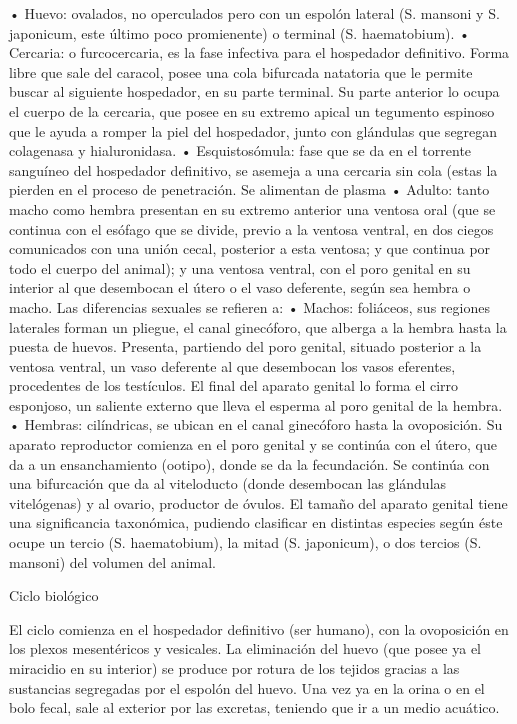 • Huevo: ovalados, no operculados pero con un espolón lateral (S. mansoni y S. japonicum, este último poco promienente) o terminal (S. haematobium).
• Cercaria: o furcocercaria, es la fase infectiva para el hospedador definitivo. Forma libre que sale del caracol, posee una cola bifurcada natatoria que le permite buscar al siguiente hospedador, en su parte terminal. Su parte anterior lo ocupa el cuerpo de la cercaria, que posee en su extremo apical un tegumento espinoso que le ayuda a romper la piel del hospedador, junto con glándulas que segregan colagenasa y hialuronidasa.
• Esquistosómula: fase que se da en el torrente sanguíneo del hospedador definitivo, se asemeja a una cercaria sin cola (estas la pierden en el proceso de penetración. Se alimentan de plasma
• Adulto: tanto macho como hembra presentan en su extremo anterior una ventosa oral (que se continua con el esófago que se divide, previo a la ventosa ventral, en dos ciegos comunicados con una unión cecal, posterior a esta ventosa; y que continua por todo el cuerpo del animal); y una ventosa ventral, con el poro genital en su interior al que desembocan el útero o el vaso deferente, según sea hembra o macho. Las diferencias sexuales se refieren a:
• Machos: foliáceos, sus regiones laterales forman un pliegue, el canal ginecóforo, que alberga a la hembra hasta la puesta de huevos. Presenta, partiendo del poro genital, situado posterior a la ventosa ventral, un vaso deferente al que desembocan los vasos eferentes, procedentes de los testículos. El final del aparato genital lo forma el cirro esponjoso, un saliente externo que lleva el esperma al poro genital de la hembra.
• Hembras: cilíndricas, se ubican en el canal ginecóforo hasta la ovoposición. Su aparato reproductor comienza en el poro genital y se continúa con el útero, que da a un ensanchamiento (ootipo), donde se da la fecundación. Se continúa con una bifurcación que da al viteloducto (donde desembocan las glándulas vitelógenas) y al ovario, productor de óvulos. El tamaño del aparato genital tiene una significancia taxonómica, pudiendo clasificar en distintas especies según éste ocupe un tercio (S. haematobium), la mitad (S. japonicum), o dos tercios (S. mansoni) del volumen del animal.














Ciclo biológico

El ciclo comienza en el hospedador definitivo (ser humano), con la ovoposición en los plexos mesentéricos y vesicales. La eliminación del huevo (que posee ya el miracidio en su interior) se produce por rotura de los tejidos gracias a las sustancias segregadas por el espolón del huevo. Una vez ya en la orina o en el bolo fecal, sale al exterior por las excretas, teniendo que ir a un medio acuático.

